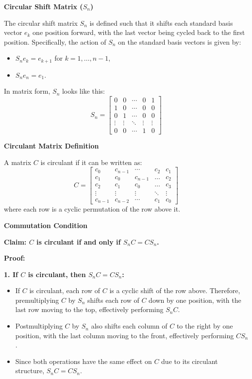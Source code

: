 \documentclass[8pt]{article}
\begin{document}
\textbf{Circular Shift Matrix (\(S_n\))}

The circular shift matrix \(S_n\) is defined such that it shifts each standard basis vector \(e_k\) one position forward, with the last vector being cycled back to the first position. Specifically, the action of \(S_n\) on the standard basis vectors is given by:

\begin{itemize}
    \item \(S_n e_k = e_{k+1}\) for \(k = 1, \ldots, n-1\),
    \item \(S_n e_n = e_1\).
\end{itemize}

In matrix form, \(S_n\) looks like this:
\[
S_n = \begin{bmatrix}
0 & 0 & \cdots & 0 & 1 \\
1 & 0 & \cdots & 0 & 0 \\
0 & 1 & \cdots & 0 & 0 \\
\vdots & \vdots & \ddots & \vdots & \vdots \\
0 & 0 & \cdots & 1 & 0
\end{bmatrix}
\]

\textbf{Circulant Matrix Definition}

A matrix \(C\) is circulant if it can be written as:
\[
C = \begin{bmatrix}
c_0 & c_{n-1} & \cdots & c_2 & c_1 \\
c_1 & c_0 & c_{n-1} & \dots & c_2 \\
c_2 & c_1 & c_0 & \dots & c_3 \\
\vdots & \vdots & \vdots & \ddots & \vdots \\
c_{n-1} & c_{n-2} & \cdots & c_1 & c_0
\end{bmatrix}
\]
where each row is a cyclic permutation of the row above it.

\textbf{Commutation Condition}

\textbf{Claim: \(C\) is circulant if and only if \(S_n C = C S_n\).}

\textbf{Proof:}

\textbf{1. If \(C\) is circulant, then \(S_n C = C S_n\):}
\begin{itemize}
    \item If \(C\) is circulant, each row of \(C\) is a cyclic shift of the row above. Therefore, premultiplying \(C\) by \(S_n\) shifts each row of \(C\) down by one position, with the last row moving to the top, effectively performing \(S_n C\).
    \item Postmultiplying \(C\) by \(S_n\) also shifts each column of \(C\) to the right by one position, with the last column moving to the front, effectively performing \(C S_n\).
    \item Since both operations have the same effect on \(C\) due to its circulant structure, \(S_n C = C S_n\).
\end{itemize}
\end{document}
